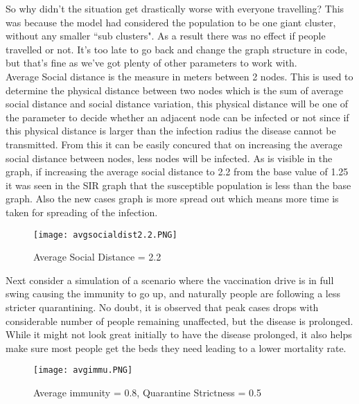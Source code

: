 \documentclass[conference]{IEEEtran}
\begin{document}
            So why didn't the situation get drastically worse with everyone travelling? This was because the model had considered the population to be one giant cluster, without any smaller ``sub clusters". As a result there was no effect if people travelled or not. It's too late to go back and change the graph structure in code, but that's fine as we've got plenty of other parameters to work with.\\
            
            Average Social distance is the measure in meters between 2 nodes. This is used to determine the physical distance between two nodes which is the sum of average social distance and social distance variation, this physical distance will be one of the parameter to decide whether an adjacent node can be infected or not since if this physical distance is larger than the infection radius the disease cannot be transmitted. From this it can be easily concured that on increasing the average social distance between nodes, less nodes will be infected. As is visible in the graph, if increasing the average social distance to 2.2 from the base value of 1.25 it was seen in the SIR graph that the susceptible population is less than the base graph. Also the new cases graph is more spread out which means more time is taken for spreading of the infection.\\
            \begin{figure}[!h]
        		\texttt{[image: avgsocialdist2.2.PNG]}
        		\caption{Average Social Distance = 2.2}
            \end{figure} 
    
            Next consider a simulation of a scenario where the vaccination drive is in full swing causing the immunity to go up, and naturally people are following a less stricter quarantining. No doubt, it is observed that peak cases drops with considerable number of people remaining unaffected, but the disease is prolonged. While it might not look great initially to have the disease prolonged, it also helps make sure most people get the beds they need leading to a lower mortality rate.
            \begin{figure}[!htb]
        		\texttt{[image: avgimmu.PNG]}
        		\caption{Average immunity = 0.8, Quarantine Strictness = 0.5}
            \end{figure}
            
\end{document}
